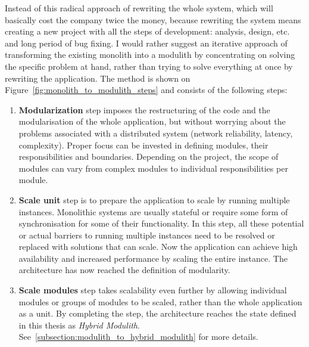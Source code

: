 Instead of this radical approach of rewriting the whole system, which will basically cost the company twice the money, because rewriting the system means creating a new project with all the steps of development: analysis, design, etc. and long period of bug fixing. I would rather suggest an iterative approach of transforming the existing monolith into a modulith by concentrating on solving the specific problem at hand, rather than trying to solve everything at once by rewriting the application. The method is shown on Figure~\ref{fig:monolith_to_modulith_steps} and consists of the following steps:

\begin{enumerate}
    \item \textbf{Modularization} step imposes the restructuring of the code and the modularisation of the whole application, but without worrying about the problems associated with a distributed system (network reliability, latency, complexity). Proper focus can be invested in defining modules, their responsibilities and boundaries. Depending on the project, the scope of modules can vary from complex modules to individual responsibilities per module.
    \item \textbf{Scale unit} step is to prepare the application to scale by running multiple instances. Monolithic systems are usually stateful or require some form of synchronisation for some of their functionality. In this step, all these potential or actual barriers to running multiple instances need to be resolved or replaced with solutions that can scale. Now the application can achieve high availability and increased performance by scaling the entire instance. The architecture has now reached the definition of modularity.
    \item \textbf{Scale modules} step takes scalability even further by allowing individual modules or groups of modules to be scaled, rather than the whole application as a unit. By completing the step, the architecture reaches the state defined in this thesis as \textit{Hybrid Modulith}. See~\ref{subsection:modulith_to_hybrid_modulith} for more details.
\end{enumerate}

